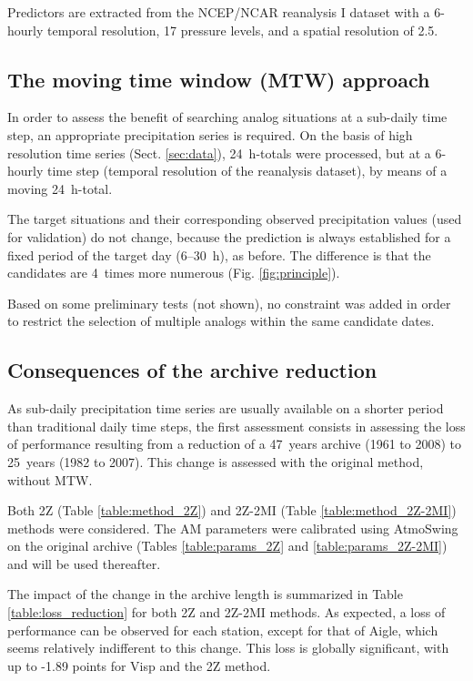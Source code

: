 \documentclass[hess, manuscript]{copernicus}
\begin{document}
Predictors are extracted from the NCEP/NCAR reanalysis I \citep{Kalnay1996} dataset with a 6-hourly temporal resolution, 17 pressure levels, and a spatial resolution of 2.5\degree.


\subsection{The moving time window (MTW) approach}
\label{sec:method}

In order to assess the benefit of searching analog situations at a sub-daily time step, an appropriate precipitation series is required. On the basis of high resolution time series (Sect. \ref{sec:data}), 24~h-totals were processed, but at a 6-hourly time step (temporal resolution of the reanalysis dataset), by means of a moving 24~h-total. 

The target situations and their corresponding observed precipitation values (used for validation) do not change, because the prediction is always established for a fixed period of the target day (6--30~h), as before. The difference is that the candidates are 4~times more numerous (Fig. \ref{fig:principle}).

Based on some preliminary tests (not shown), no constraint was added in order to restrict the selection of multiple analogs within the same candidate dates.


\subsection{Consequences of the archive reduction}
\label{sec:archive_reduction}

As sub-daily precipitation time series are usually available on a shorter period than traditional daily time steps, the first assessment consists in assessing the loss of performance resulting from a reduction of a 47~years archive (1961 to 2008) to 25~years (1982 to 2007). This change is assessed with the original method, without MTW.

Both 2Z (Table \ref{table:method_2Z}) and 2Z-2MI (Table \ref{table:method_2Z-2MI}) methods were considered. The AM parameters were calibrated using AtmoSwing \citep{Horton2016} on the original archive (Tables \ref{table:params_2Z} and \ref{table:params_2Z-2MI}) and will be used thereafter.

The impact of the change in the archive length is summarized in Table \ref{table:loss_reduction} for both 2Z and 2Z-2MI methods. As expected, a loss of performance can be observed for each station, except for that of Aigle, which seems relatively indifferent to this change. This loss is globally significant, with up to -1.89 points for Visp and the 2Z method. 
\end{document}
